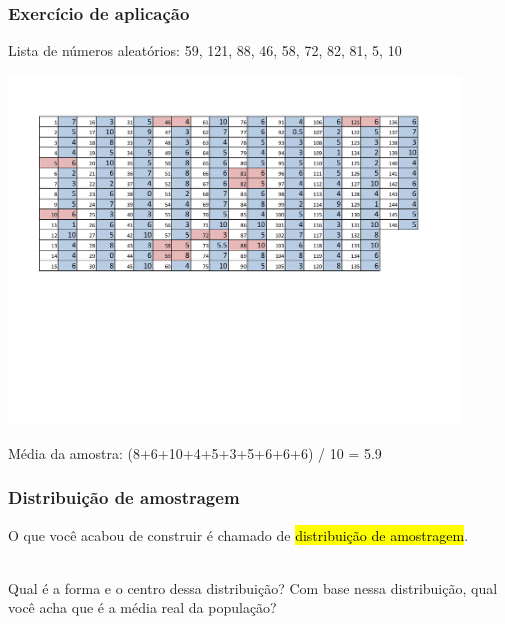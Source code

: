 
\begin{frame}[fragile]
\frametitle{Exercício de aplicação}
\justifying
{} Lista de números aleatórios: 59, 121,  88,  46,  58,  72,  82,  81,   5,  10 \\

\begin{center}
\includegraphics[width=0.9\textwidth]{4-1_var_in_est/no_drinks_drunk_marked.pdf} 
\end{center}

\pause
\justifying
Média da amostra: (8+6+10+4+5+3+5+6+6+6) / 10 = 5.9

\end{frame}



\begin{frame}[fragile]
\frametitle{Distribuição de amostragem}
\justifying
O que você acabou de construir é chamado de \hl{distribuição de amostragem}.

\pause

$\:$ \\
\justifying
\dq
{Qual é a forma e o centro dessa distribuição? Com base nessa distribuição, qual você acha que é a média real da população?}

$\:$ \\
\justifying
{}

\end{frame}



